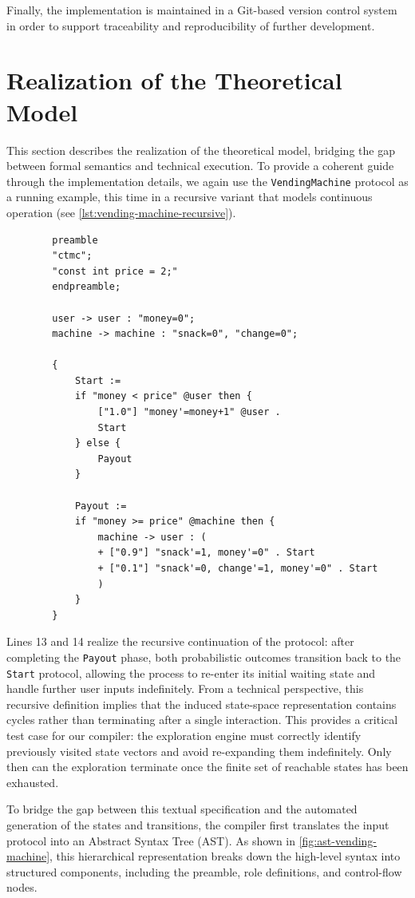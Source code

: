 Finally, the implementation is maintained in a Git-based version control system in order to support traceability and reproducibility of further development.


\section{Realization of the Theoretical Model}
This section describes the realization of the theoretical model, bridging the gap between formal semantics and technical execution. To provide a coherent guide through the implementation details, we again use the \texttt{VendingMachine} protocol as a running example, this time in a recursive variant that models continuous operation (see \cref{lst:vending-machine-recursive}).

\begin{listing}[h]
	\begin{verbatim}
		preamble
		"ctmc";
		"const int price = 2;"
		endpreamble;
		
		user -> user : "money=0";
		machine -> machine : "snack=0", "change=0";
		
		{
			Start :=
			if "money < price" @user then {
				["1.0"] "money'=money+1" @user .
				Start
			} else {
				Payout
			}
			
			Payout :=
			if "money >= price" @machine then {
				machine -> user : (
				+ ["0.9"] "snack'=1, money'=0" . Start
				+ ["0.1"] "snack'=0, change'=1, money'=0" . Start
				)
			}
		}
	\end{verbatim}
\caption{The recursive \texttt{VendingMachine} protocol}
\label{lst:vending-machine-recursive}
\end{listing}
Lines 13 and 14 realize the recursive continuation of the protocol: after completing the \texttt{Payout} phase, both probabilistic outcomes transition back to the \texttt{Start} protocol, allowing the process to re-enter its initial waiting state and handle further user inputs indefinitely. From a technical perspective, this recursive definition implies that the induced state-space representation contains cycles rather than terminating after a single interaction. This provides a critical test case for our compiler: the exploration engine must correctly identify previously visited state vectors and avoid re-expanding them indefinitely. Only then can the exploration terminate once the finite set of reachable states has been exhausted.

To bridge the gap between this textual specification and the automated generation of the states and transitions, the compiler first translates the input protocol into an Abstract Syntax Tree (AST). As shown in \cref{fig:ast-vending-machine}, this hierarchical representation breaks down the high-level syntax into structured components, including the preamble, role definitions, and control-flow nodes.


